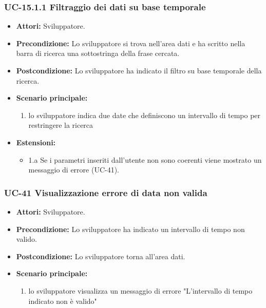 	\subsubsection{UC-15.1.1 Filtraggio dei dati su base temporale}	
		\begin{itemize}
			\item \textbf{Attori:} Sviluppatore.
			\item \textbf{Precondizione:} Lo sviluppatore si trova nell'area dati e ha scritto nella barra di ricerca una sottostringa della frase cercata.
			\item \textbf{Postcondizione:} Lo sviluppatore ha indicato il filtro su base temporale della ricerca.
			\item \textbf{Scenario principale:}
				\begin{enumerate}
					\item lo sviluppatore indica due date che definiscono un intervallo di tempo per restringere la ricerca
				\end{enumerate}
			\item \textbf{Estensioni:}
				\begin{itemize}
					\item 1.a Se i parametri inseriti dall'utente non sono coerenti viene mostrato un messaggio di errore (UC-41).
				\end{itemize}		
		\end{itemize}
			
	\subsubsection{UC-41 Visualizzazione errore di data non valida}
		\begin{itemize}					
			\item \textbf{Attori:} Sviluppatore.
			\item \textbf{Precondizione:} Lo sviluppatore ha indicato un intervallo di tempo non valido.
			\item \textbf{Postcondizione:} Lo sviluppatore torna all'area dati.
			\item \textbf{Scenario principale:}
				\begin{enumerate}
					\item lo sviluppatore visualizza un messaggio di errore "L'intervallo di tempo indicato non è valido"
				\end{enumerate}	
		\end{itemize}					
						
